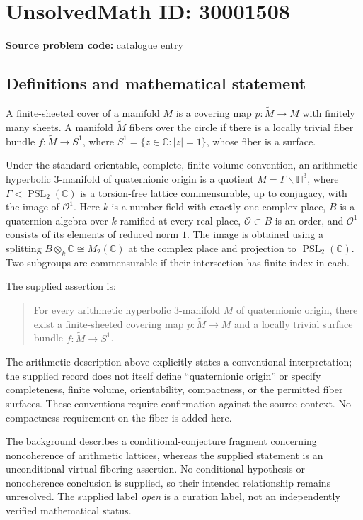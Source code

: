 \documentclass[11pt]{article}
\newcommand{\C}{\mathbb{C}}
\begin{document}
\section*{UnsolvedMath ID: 30001508}
\textbf{Source problem code:} catalogue entry
\subsection{Definitions and mathematical statement}
A finite-sheeted cover of a manifold \(M\) is a covering map \(p\colon \widetilde M\to M\) with finitely many sheets. A manifold \(\widetilde M\) fibers over the circle if there is a locally trivial fiber bundle \(f\colon\widetilde M\to S^1\), where \(S^1=\{z\in\C:|z|=1\}\), whose fiber is a surface.

Under the standard orientable, complete, finite-volume convention, an arithmetic hyperbolic \(3\)-manifold of quaternionic origin is a quotient \(M=\Gamma\backslash\mathbb H^3\), where \(\Gamma<\operatorname{PSL}_2(\C)\) is a torsion-free lattice commensurable, up to conjugacy, with the image of \(\mathcal O^1\). Here \(k\) is a number field with exactly one complex place, \(B\) is a quaternion algebra over \(k\) ramified at every real place, \(\mathcal O\subset B\) is an order, and \(\mathcal O^1\) consists of its elements of reduced norm \(1\). The image is obtained using a splitting \(B\otimes_k\C\cong M_2(\C)\) at the complex place and projection to \(\operatorname{PSL}_2(\C)\). Two subgroups are commensurable if their intersection has finite index in each.

The supplied assertion is:
\begin{quote}
For every arithmetic hyperbolic \(3\)-manifold \(M\) of quaternionic origin, there exist a finite-sheeted covering map \(p\colon\widetilde M\to M\) and a locally trivial surface bundle \(f\colon\widetilde M\to S^1\).
\end{quote}
The arithmetic description above explicitly states a conventional interpretation; the supplied record does not itself define ``quaternionic origin'' or specify completeness, finite volume, orientability, compactness, or the permitted fiber surfaces. These conventions require confirmation against the source context. No compactness requirement on the fiber is added here.

The background describes a conditional-conjecture fragment concerning noncoherence of arithmetic lattices, whereas the supplied statement is an unconditional virtual-fibering assertion. No conditional hypothesis or noncoherence conclusion is supplied, so their intended relationship remains unresolved. The supplied label \emph{open} is a curation label, not an independently verified mathematical status.
\end{document}
